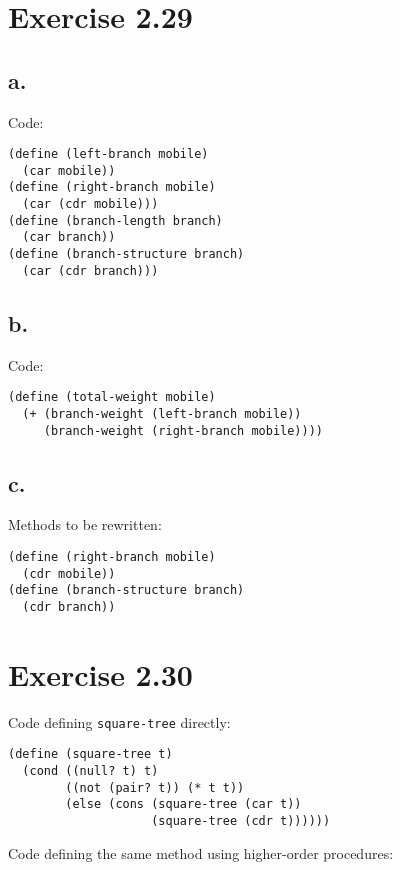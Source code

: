\documentclass[../main.tex]{subfiles}
\begin{document}
\section{Exercise 2.29}

\subsection{a.}

Code:

\begin{lstlisting}
(define (left-branch mobile)
  (car mobile))
(define (right-branch mobile)
  (car (cdr mobile)))
(define (branch-length branch)
  (car branch))
(define (branch-structure branch)
  (car (cdr branch)))
\end{lstlisting}

\subsection{b.}

Code:

\begin{lstlisting}
(define (total-weight mobile)
  (+ (branch-weight (left-branch mobile))
     (branch-weight (right-branch mobile))))
\end{lstlisting}

\subsection{c.}

Methods to be rewritten:

\begin{lstlisting}
(define (right-branch mobile)
  (cdr mobile))
(define (branch-structure branch)
  (cdr branch))
\end{lstlisting}

\section{Exercise 2.30}

Code defining \lstinline{square-tree} directly:

\begin{lstlisting}
(define (square-tree t)
  (cond ((null? t) t)
        ((not (pair? t)) (* t t))
        (else (cons (square-tree (car t))
                    (square-tree (cdr t))))))
\end{lstlisting}

Code defining the same method using higher-order
 procedures:
 
\end{document}
